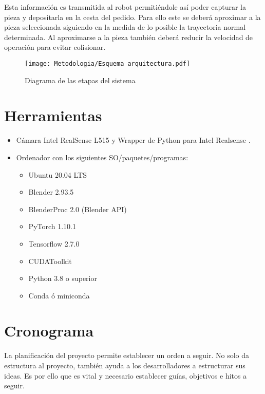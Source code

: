 Esta información es transmitida al robot permitiéndole así poder capturar la pieza y depositarla en la cesta del pedido. Para ello este se deberá aproximar a la pieza seleccionada siguiendo en la medida de lo posible la trayectoria normal determinada. Al aproximarse a la pieza también deberá reducir la velocidad de operación para evitar colisionar.

\begin{figure}[ht]
	\centering
	\texttt{[image: Metodologia/Esquema arquitectura.pdf]}
	\caption{Diagrama de las etapas del sistema}
	\label{chap:Metodología fig:Arq2}
	\vspace{-5pt}
\end{figure}

\section{Herramientas}
\label{chap:Metodología sec:Herramientas}
\begin{itemize}
	\item Cámara Intel RealSense L515 \cite{IntelL515} y Wrapper de Python para Intel Realsense \cite{SDK}.
	\item Ordenador con los siguientes SO/paquetes/programas:
		\begin{itemize}
			\item Ubuntu 20.04 LTS
			\item Blender 2.93.5
			\item BlenderProc 2.0 (Blender API)
			\item PyTorch 1.10.1
			\item Tensorflow 2.7.0
			\item CUDAToolkit
			\item Python 3.8 o superior
			\item Conda ó miniconda
		\end{itemize}
\end{itemize}

\section{Cronograma}
\label{chap:Metodología sec:Cronograma}
La planificación del proyecto permite establecer un orden a seguir. No solo da estructura al proyecto, también ayuda a los desarrolladores a estructurar sus ideas. Es por ello que es vital y necesario establecer guías, objetivos e hitos a seguir.

